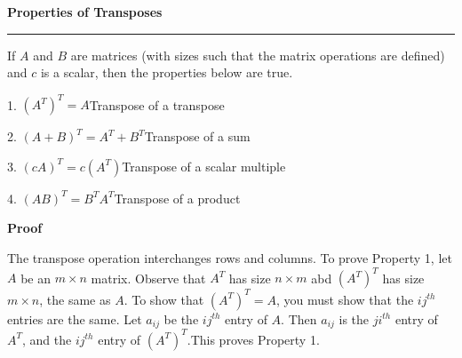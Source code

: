\nopagenumbers
{\bf Properties of Transposes}
\vskip 1mm
\hrule

\vskip 6pt
If $A$ and $B$ are matrices (with sizes such that the matrix operations are defined) and $c$ is a scalar, then the properties below are true.

\vskip 10pt
1. $(A^T)^T=A$\quad\quad\quad\quad\quad\quad\quad\quad Transpose of a transpose

\vskip 6pt
2. $(A+B)^T=A^T+B^T$\quad\quad\quad Transpose of a sum

\vskip 6pt
3. $(cA)^T=c(A^T)$\quad\quad\quad\quad\quad\quad Transpose of a scalar multiple

\vskip 6pt
4. $(AB)^T=B^TA^T$\quad\quad\quad\quad\quad Transpose of a product

\vskip 10pt
{\bf Proof}

\vskip 6pt
The transpose operation interchanges rows and columns. To prove Property 1, let $A$ be an $m\times n$ matrix. Observe that $A^T$ has size $n\times m$ abd $(A^T)^T$ has size $m\times n$, the same as $A$. To show that $(A^T)^T=A$, you must show that the $ij^{th}$ entries are the same. Let $a_{ij}$ be the $ij^{th}$ entry of $A$. Then $a_{ij}$ is the $ji^{th}$ entry of $A^T$, and the $ij^{th}$ entry of $(A^T)^T$.This proves Property 1.


\vfill\eject
\bye

